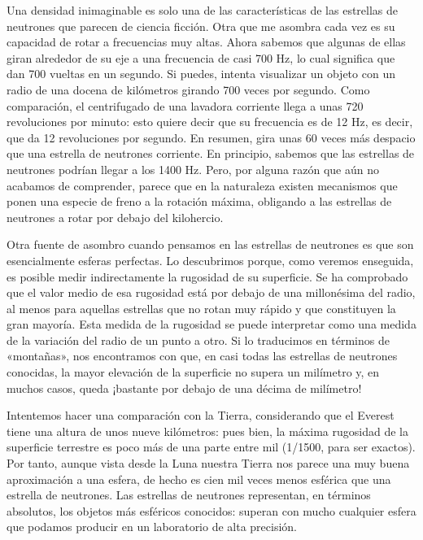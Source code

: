 Una densidad inimaginable es solo una de las características de las estrellas de neutrones que parecen de ciencia ficción. Otra que me asombra cada vez es su capacidad de rotar a frecuencias muy altas. Ahora sabemos que algunas de ellas giran alrededor de su eje a una frecuencia de casi 700 Hz, lo cual significa que dan 700 vueltas en un segundo. Si puedes, intenta visualizar un objeto con un radio de una docena de kilómetros girando 700 veces por segundo. Como comparación, el centrifugado de una lavadora corriente llega a unas 720 revoluciones por minuto: esto quiere decir que su frecuencia es de 12 Hz, es decir, que da 12 revoluciones por segundo. En resumen, gira unas 60 veces más despacio que una estrella de neutrones corriente. En principio, sabemos que las estrellas de neutrones podrían llegar a los 1400 Hz. Pero, por alguna razón que aún no acabamos de comprender, parece que en la naturaleza existen mecanismos que ponen una especie de freno a la rotación máxima, obligando a las estrellas de neutrones a rotar por debajo del kilohercio.

Otra fuente de asombro cuando pensamos en las estrellas de neutrones es que son esencialmente esferas perfectas. Lo descubrimos porque, como veremos enseguida, es posible medir indirectamente la rugosidad de su superficie. Se ha comprobado que el valor medio de esa rugosidad está por debajo de una millonésima del radio, al menos para aquellas estrellas que no rotan muy rápido y que constituyen la gran mayoría. Esta medida de la rugosidad se puede interpretar como una medida de la variación del radio de un punto a otro. Si lo traducimos en términos de «montañas», nos encontramos con que, en casi todas las estrellas de neutrones conocidas, la mayor elevación de la superficie no supera un milímetro y, en muchos casos, queda ¡bastante por debajo de una décima de milímetro!

Intentemos hacer una comparación con la Tierra, considerando que el Everest tiene una altura de unos nueve kilómetros: pues bien, la máxima rugosidad de la superficie terrestre es poco más de una parte entre mil (1/1500, para ser exactos). Por tanto, aunque vista desde la Luna nuestra Tierra nos parece una muy buena aproximación a una esfera, de hecho es cien mil veces menos esférica que una estrella de neutrones. Las estrellas de neutrones representan, en términos absolutos, los objetos más esféricos conocidos: superan con mucho cualquier esfera que podamos producir en un laboratorio de alta precisión.

